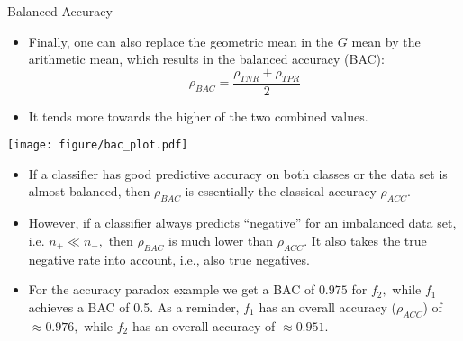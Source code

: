 \begin{vbframe}{Balanced Accuracy}
	\footnotesize
	
	\begin{minipage}[c]{0.5\textwidth}
		\footnotesize
		\begin{itemize}
			\item 	Finally, one can also replace the geometric mean in the $G$ mean by the arithmetic mean, which results in the balanced accuracy (BAC): 
			$$\rho_{BAC} = \frac{\rho_{TNR} + \rho_{TPR}}{2}$$
			\item  It tends more towards the higher of the two combined values.
		\end{itemize}
	\end{minipage}%
	\begin{minipage}[c]{0.5\textwidth}
		\centering
		\texttt{[image: figure/bac\_plot.pdf]}
	\end{minipage}
	\begin{itemize}
		\item If a classifier has good predictive accuracy on both classes or the data set is almost balanced, then $\rho_{BAC} $ is essentially the classical accuracy $\rho_{ACC}$.
%		
		\item However, if a classifier always predicts ``negative'' for an imbalanced data set, i.e. $n_+  \ll n_-,$ then $\rho_{BAC} $ is much lower than $\rho_{ACC}$.
		It also takes the true negative rate into account, i.e., also true negatives.
		\item For the accuracy paradox example we get a BAC of $0.975$ for $f_2,$ while $f_1$ achieves a BAC of 0.5. As a reminder, $f_1$ has an overall accuracy ($\rho_{ACC}$) of $\approx 0.976,$ while $f_2$ has an overall accuracy of $\approx 0.951.$
	\end{itemize}
	
\end{vbframe}


